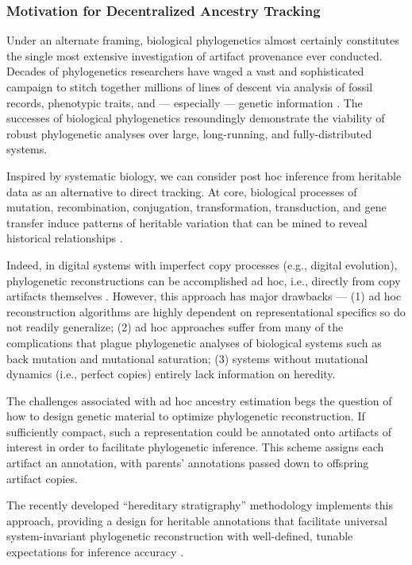 \subsubsection{Motivation for Decentralized Ancestry Tracking}

Under an alternate framing, biological phylogenetics almost certainly constitutes the single most extensive investigation of artifact provenance ever conducted.
Decades of phylogenetics researchers have waged a vast and sophisticated campaign to stitch together millions of lines of descent via analysis of fossil records, phenotypic traits, and --- especially --- genetic information \citep{hinchliff2015synthesis,lee2015morphological}.
The successes of biological phylogenetics resoundingly demonstrate the viability of robust phylogenetic analyses over large, long-running, and fully-distributed systems.

Inspired by systematic biology, we can consider post hoc inference from heritable data as an alternative to direct tracking.
At core, biological processes of mutation, recombination, conjugation, transformation, transduction, and gene transfer induce patterns of heritable variation that can be mined to reveal historical relationships \citep{davis1992populations}.

Indeed, in digital systems with imperfect copy processes (e.g., digital evolution), phylogenetic reconstructions can be accomplished ad hoc, i.e., directly from copy artifacts themselves \citep{moreno2021case}.
However, this approach has major drawbacks ---
(1) ad hoc reconstruction algorithms are highly dependent on representational specifics so do not readily generalize;
(2) ad hoc approaches suffer from many of the complications that plague phylogenetic analyses of biological systems such as back mutation and mutational saturation;
(3) systems without mutational dynamics (i.e., perfect copies) entirely lack information on heredity.

The challenges associated with ad hoc ancestry estimation begs the question of how to design genetic material to optimize phylogenetic reconstruction.
If sufficiently compact, such a representation could be annotated onto artifacts of interest in order to facilitate phylogenetic inference.
This scheme assigns each artifact an annotation, with parents' annotations passed down to offspring artifact copies.

The recently developed ``hereditary stratigraphy'' methodology implements this approach, providing a design for heritable annotations that facilitate universal system-invariant phylogenetic reconstruction with well-defined, tunable expectations for inference accuracy \citep{moreno2022hereditary}.

